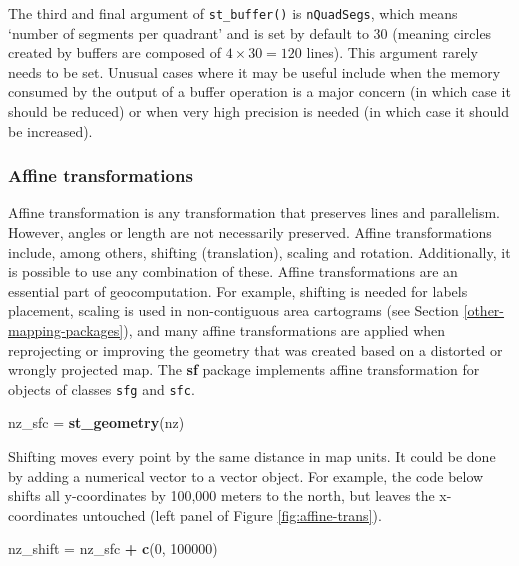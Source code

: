 \documentclass[]{krantz}
\newenvironment{Shaded}{\begin{snugshade}}{\end{snugshade}}
\newcommand{\DecValTok}[1]{\textcolor[rgb]{0.06,0.06,0.06}{#1}}
\newcommand{\KeywordTok}[1]{\textcolor[rgb]{0.27,0.27,0.27}{\textbf{#1}}}
\newcommand{\NormalTok}[1]{#1}
\newcommand{\OperatorTok}[1]{\textcolor[rgb]{0.43,0.43,0.43}{\textbf{#1}}}
\newcommand{\StringTok}[1]{\textcolor[rgb]{0.5,0.5,0.5}{#1}}
\let\BeginKnitrBlock\begin \let\EndKnitrBlock\end
\begin{document}
\BeginKnitrBlock{rmdnote}
The third and final argument of \texttt{st\_buffer()} is \texttt{nQuadSegs}, which means `number of segments per quadrant' and is set by default to 30 (meaning circles created by buffers are composed of \(4 \times 30 = 120\) lines).
This argument rarely needs to be set.
Unusual cases where it may be useful include when the memory consumed by the output of a buffer operation is a major concern (in which case it should be reduced) or when very high precision is needed (in which case it should be increased).
\EndKnitrBlock{rmdnote}

\hypertarget{affine-transformations}{%
\subsubsection{Affine transformations}\label{affine-transformations}}

Affine transformation is any transformation that preserves lines and parallelism.
However, angles or length are not necessarily preserved.
Affine transformations include, among others, shifting (translation), scaling and rotation.
Additionally, it is possible to use any combination of these.
Affine transformations are an essential part of geocomputation.
For example, shifting is needed for labels placement, scaling is used in non-contiguous area cartograms (see Section \ref{other-mapping-packages}), and many affine transformations are applied when reprojecting or improving the geometry that was created based on a distorted or wrongly projected map.
The \textbf{sf} package implements affine transformation for objects of classes \texttt{sfg} and \texttt{sfc}.

\begin{Shaded}
\begin{Highlighting}[]
\NormalTok{nz_sfc =}\StringTok{ }\KeywordTok{st_geometry}\NormalTok{(nz)}
\end{Highlighting}
\end{Shaded}

Shifting moves every point by the same distance in map units.
It could be done by adding a numerical vector to a vector object.
For example, the code below shifts all y-coordinates by 100,000 meters to the north, but leaves the x-coordinates untouched (left panel of Figure \ref{fig:affine-trans}).

\begin{Shaded}
\begin{Highlighting}[]
\NormalTok{nz_shift =}\StringTok{ }\NormalTok{nz_sfc }\OperatorTok{+}\StringTok{ }\KeywordTok{c}\NormalTok{(}\DecValTok{0}\NormalTok{, }\DecValTok{100000}\NormalTok{)}
\end{Highlighting}
\end{Shaded}
\end{document}
